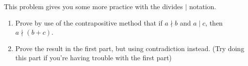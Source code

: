 This problem gives you some more practice with the divides $\mid$ notation.

\begin{enumerate}
    \item Prove by use of the contrapositive method that if $a \nmid b$ and $a \mid c$, then $a \nmid (b + c)$. 
    
    \item Prove the result in the first part, but using contradiction instead. (Try doing this part if you're having trouble with the first part)
\end{enumerate}